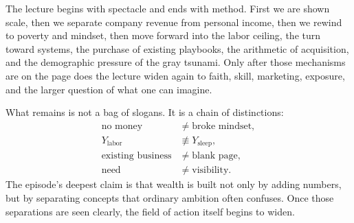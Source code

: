 The lecture begins with spectacle and ends with method. First we are shown scale, then we separate company revenue from personal income, then we rewind to poverty and mindset, then move forward into the labor ceiling, the turn toward systems, the purchase of existing playbooks, the arithmetic of acquisition, and the demographic pressure of the gray tsunami. Only after those mechanisms are on the page does the lecture widen again to faith, skill, marketing, exposure, and the larger question of what one can imagine.

What remains is not a bag of slogans. It is a chain of distinctions:
\begin{align}
\text{no money} &\neq \text{broke mindset}, \\
Y_{\text{labor}} &\not\equiv Y_{\text{sleep}}, \\
\text{existing business} &\neq \text{blank page}, \\
\text{need} &\neq \text{visibility}.
\end{align}
The episode's deepest claim is that wealth is built not only by adding numbers, but by separating concepts that ordinary ambition often confuses. Once those separations are seen clearly, the field of action itself begins to widen.